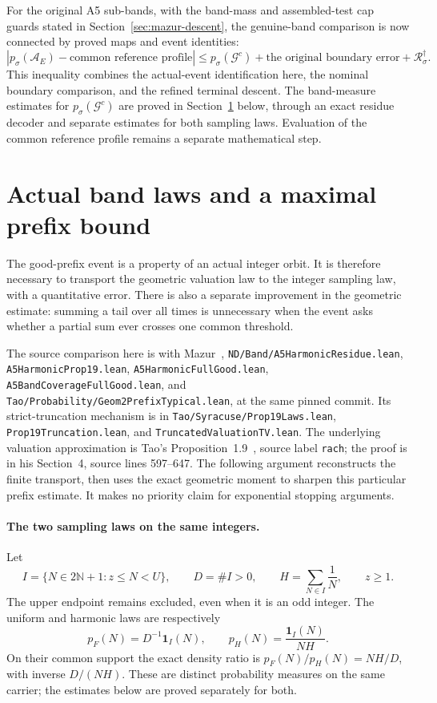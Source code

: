 \documentclass[11pt]{article}
\theoremstyle{remark}\newtheorem{remark}[proposition]{Remark}
\begin{document}
For the original A5 sub-bands, with the band-mass and assembled-test
cap guards stated in Section~\ref{sec:mazur-descent}, the genuine-band
comparison is now connected by proved maps and event identities:
\[
 |p_\sigma(\mathcal A_E)-\text{common reference profile}|
 \le p_\sigma(\mathcal G^c)
      +\text{the original boundary error}
      +\mathcal R_\sigma^\dagger .
\]
This inequality combines the actual-event identification here, the
nominal boundary comparison, and the refined terminal descent.
The band-measure estimates for $p_\sigma(\mathcal G^c)$ are proved
in Section~\ref{sec:mazur-band-fullgood} below, through an exact residue
decoder and separate estimates for both sampling laws. Evaluation of
the common reference profile remains a separate mathematical step.


\section{Actual band laws and a maximal prefix bound}
\label{sec:mazur-band-fullgood}

The good-prefix event is a property of an actual integer orbit. It is
therefore necessary to transport the geometric valuation law to the
integer sampling law, with a quantitative error. There is also a
separate improvement in the geometric estimate: summing a tail over
all times is unnecessary when the event asks whether a partial sum
ever crosses one common threshold.

The source comparison here is with Mazur~\cite{Mazur2026v2},
\texttt{ND/Band/A5HarmonicResidue.lean},
\texttt{A5HarmonicProp19.lean}, \texttt{A5HarmonicFullGood.lean},
\texttt{A5BandCoverageFullGood.lean}, and
\texttt{Tao/Probability/Geom2PrefixTypical.lean}, at the same pinned
commit. Its strict-truncation mechanism is in
\texttt{Tao/Syracuse/Prop19Laws.lean},
\texttt{Prop19Truncation.lean}, and
\texttt{TruncatedValuationTV.lean}.
The underlying valuation approximation is Tao's
Proposition~1.9~\cite{Tao7}, source label \texttt{rach};
the proof is in his Section~4, source lines 597--647.
The following argument reconstructs the finite transport, then uses
the exact geometric moment to sharpen this particular prefix estimate.
It makes no priority claim for exponential stopping arguments.

\paragraph{The two sampling laws on the same integers.}
Let
\[
 I= \{N\in2\mathbb N+1:z\le N<U\},\qquad
 D=\#I>0,\qquad H=\sum_{N\in I}\frac1N,\qquad z\ge1.
\]
The upper endpoint remains excluded, even when it is an odd integer.
The uniform and harmonic laws are respectively
\[
 p_F(N)=D^{-1}\mathbf1_I(N),\qquad
 p_H(N)=\frac{\mathbf1_I(N)}{NH}.
\]
On their common support the exact density ratio is
$p_F(N)/p_H(N)=NH/D$, with inverse $D/(NH)$.
These are distinct probability measures on the same carrier;
the estimates below are proved separately for both.
\end{document}
